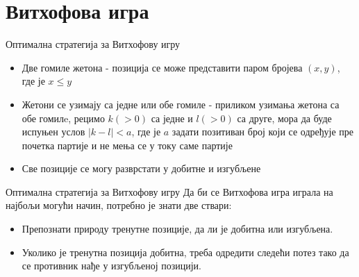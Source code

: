 \documentclass[10pt]{beamer}
\theoremstyle{remark}
\theoremstyle{definition}
\begin{document}
\section{Витхофова игра}
	\begin{frame}{Оптимална стратегија за Витхофову игру}
		
		\begin{itemize}
			\item Две гомиле жетона - позиција се може представити паром бројева $ (x, y) $, где је $ x \leq  y $
			\item Жетони се узимају са једне или обе гомиле - приликом узимања жетона са обе гомилe, рецимо $ k (> 0) $ са једне и $ l (> 0) $ са друге, мора да буде испуњен услов $ |k - l| < a $, где је $ a $ задати позитиван број који се одређује пре почетка партије и не мења се у току саме партије
			\item Све позиције се могу разврстати у добитне и изгубљене
		\end{itemize}
	\end{frame}

	\begin{frame}{Оптимална стратегија за Витхофову игру}
		Да би се Витхофова игра играла на најбољи могући начин, потребно је знати две ствари:
		\begin{itemize}
			\item Препознати природу тренутне позиције, да ли је добитна или изгубљена.
			\item Уколико је тренутна позиција добитна, треба одредити следећи потез тако да се противник нађе у изгубљеној позицији.
		\end{itemize}		
	\end{frame}
	
\end{document}
